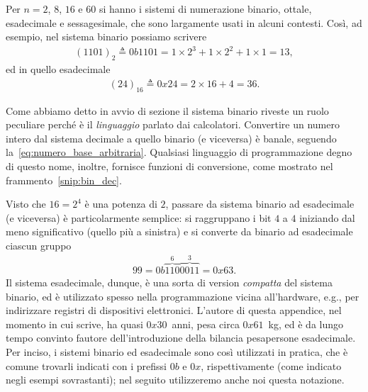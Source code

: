 Per $n = 2$, $8$, $16$ e $60$ si hanno i sistemi di numerazione binario, ottale,
esadecimale e sessagesimale, che sono largamente usati in alcuni contesti.
Così, ad esempio, nel sistema binario possiamo scrivere
\begin{align*}
  (1101)_2 \triangleq 0b1101 =
  1 \times 2^3 + 1 \times 2^2 + 1 \times 1 = 13,
\end{align*}
ed in quello esadecimale
\begin{align*}
  (24)_{16} \triangleq 0x24 =
  2 \times 16 + 4 = 36.
\end{align*}

Come abbiamo detto in avvio di sezione il sistema binario riveste un ruolo
peculiare perché è il \emph{linguaggio} parlato dai calcolatori. Convertire
un numero intero dal sistema decimale a quello binario (e viceversa) è
banale, seguendo la~\eqref{eq:numero_base_arbitraria}. Qualsiasi linguaggio
di programmazione degno di questo nome, inoltre, fornisce funzioni di
conversione, come mostrato nel frammento~\ref{snip:bin_dec}.


Visto che $16 = 2^4$ \`e una potenza di $2$, passare da sistema binario ad esadecimale
(e viceversa) \`e particolarmente semplice: si raggruppano i bit $4$ a $4$ iniziando
dal meno significativo (quello pi\`u a sinistra) e si converte da binario ad esadecimale
ciascun gruppo
\begin{align*}
  99 = 0b\overbrace{110}^6\overbrace{0011}^3 = 0x63.
\end{align*}
Il sistema esadecimale, dunque, \`e una sorta di version \emph{compatta} del
sistema binario, ed \`e utilizzato spesso nella programmazione vicina all'hardware,
e.g., per indirizzare registri di dispositivi elettronici.
L'autore di questa appendice, nel momento in cui scrive, ha quasi $0x30$~anni,
pesa circa $0x61$~kg, ed è da lungo tempo convinto fautore dell'introduzione
della bilancia pesapersone esadecimale. Per inciso, i sistemi binario ed
esadecimale sono così utilizzati in pratica, che è comune trovarli indicati
con i prefissi $0b$ e $0x$, rispettivamente (come indicato negli esempi
sovrastanti); nel seguito utilizzeremo anche noi questa notazione.


